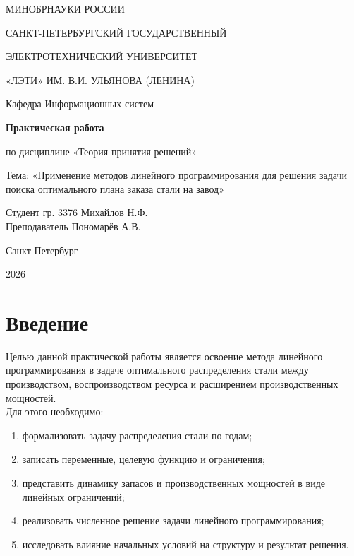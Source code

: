 \documentclass[a4paper,12pt]{article}
\begin{document}
\begin{titlepage}
    \centering
    {\large МИНОБРНАУКИ РОССИИ\par}
    \vspace{0.5em}
    {\large САНКТ-ПЕТЕРБУРГСКИЙ ГОСУДАРСТВЕННЫЙ\par}
    {\large ЭЛЕКТРОТЕХНИЧЕСКИЙ УНИВЕРСИТЕТ\par}
    {\large «ЛЭТИ» ИМ. В.И. УЛЬЯНОВА (ЛЕНИНА)\par}
    \vspace{1em}
    {\large Кафедра Информационных систем\par}

    \vspace{6em}

    {\LARGE \textbf{Практическая работа}\par}
    \vspace{0.8em}
    {\large по дисциплине «Теория принятия решений»\par}
    \vspace{0.8em}
    {\large Тема: «Применение методов линейного программирования для решения задачи поиска оптимального плана заказа стали на завод»\par}

    \vfill

    \begin{flushleft}
        Студент гр. 3376 \hfill Михайлов Н.Ф.\\[0.5em]
        Преподаватель   \hfill Пономарёв А.В.
    \end{flushleft}

    \vspace{3em}

    Санкт-Петербург\par
    2026
\end{titlepage}

\tableofcontents
\newpage

\section{Введение}
Целью данной практической работы является освоение метода линейного
программирования в задаче оптимального распределения стали между производством,
воспроизводством ресурса и расширением производственных мощностей. \\
Для этого необходимо:
\begin{enumerate}
    \item формализовать задачу распределения стали по годам;
    \item записать переменные, целевую функцию и ограничения;
    \item представить динамику запасов и производственных мощностей в виде
    линейных ограничений;
    \item реализовать численное решение задачи линейного программирования;
    \item исследовать влияние начальных условий на структуру и результат решения.
\end{enumerate}
\end{document}
